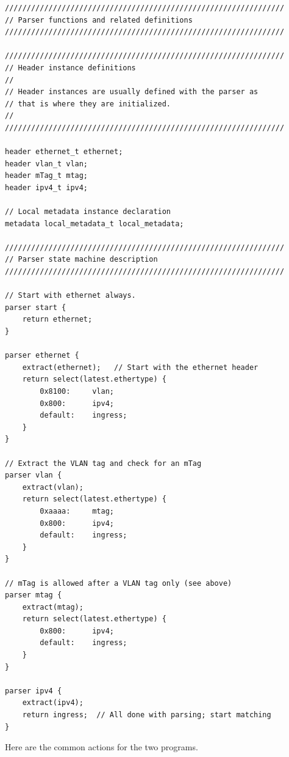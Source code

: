 \documentclass[12pt]{article}
\begin{document}
\begin{lstlisting}[style=P4style]
////////////////////////////////////////////////////////////////
// Parser functions and related definitions
////////////////////////////////////////////////////////////////

////////////////////////////////////////////////////////////////
// Header instance definitions
//
// Header instances are usually defined with the parser as
// that is where they are initialized.
//
////////////////////////////////////////////////////////////////

header ethernet_t ethernet;
header vlan_t vlan;
header mTag_t mtag;
header ipv4_t ipv4;

// Local metadata instance declaration
metadata local_metadata_t local_metadata;

////////////////////////////////////////////////////////////////
// Parser state machine description
////////////////////////////////////////////////////////////////

// Start with ethernet always.
parser start {
    return ethernet;    
}

parser ethernet {
    extract(ethernet);   // Start with the ethernet header
    return select(latest.ethertype) {
        0x8100:     vlan;
        0x800:      ipv4;
        default:    ingress;
    }
}

// Extract the VLAN tag and check for an mTag
parser vlan {
    extract(vlan);
    return select(latest.ethertype) {
        0xaaaa:     mtag;
        0x800:      ipv4;
        default:    ingress;
    }
}

// mTag is allowed after a VLAN tag only (see above)
parser mtag {
    extract(mtag);
    return select(latest.ethertype) {
        0x800:      ipv4;
        default:    ingress;
    }
}

parser ipv4 {
    extract(ipv4);
    return ingress;  // All done with parsing; start matching
}
\end{lstlisting}

Here are the common actions for the two programs.
\end{document}
